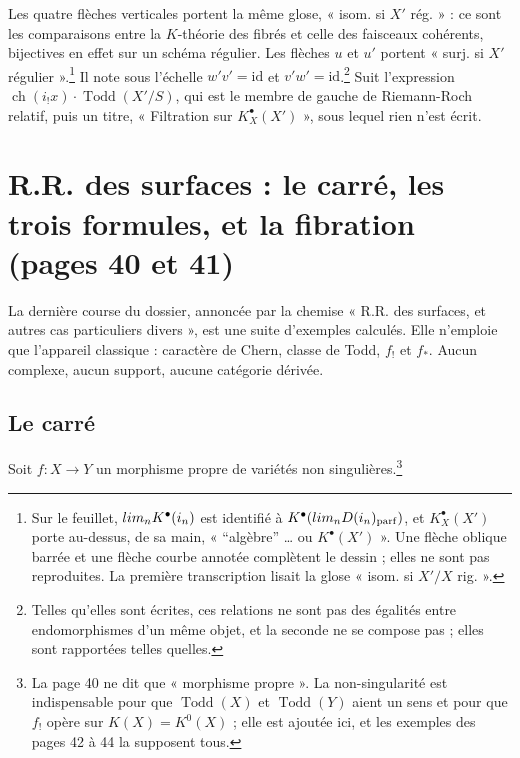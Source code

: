\documentclass[11pt,a4paper]{article}
\begin{document}
Les quatre flèches verticales portent la même glose, « isom. si $X'$ rég. » :
ce sont les comparaisons entre la $K$-théorie des fibrés et celle des faisceaux
cohérents, bijectives en effet sur un schéma régulier. Les flèches $u$ et $u'$
portent « surj. si $X'$ régulier ».\footnote{Sur le feuillet,
$\varinjlim_{n} K^{\bullet}(i_{n})$ est identifié à
$K^{\bullet}(\varinjlim_{n} D(i_{n})_{\mathrm{parf}})$, et $K^{\bullet}_{X}(X')$
porte au-dessus, de sa main, « “algèbre” \ldots{} ou $K^{\bullet}(X')$ ». Une
flèche oblique barrée et une flèche courbe annotée complètent le dessin ; elles
ne sont pas reproduites. La première transcription lisait la glose « isom. si
$X'/X$ rig. ».} Il note sous l'échelle $w'v' = \mathrm{id}$ et
$v'w' = \mathrm{id}$.\footnote{Telles qu'elles sont écrites, ces relations
ne sont pas des égalités entre endomorphismes d'un même objet, et la seconde
ne se compose pas ; elles sont rapportées telles quelles.} Suit l'expression $\operatorname{ch}(i_{!}x)\cdot
\operatorname{Todd}(X'/S)$, qui est le membre de gauche de Riemann-Roch relatif,
puis un titre, « Filtration sur $K^{\bullet}_{X}(X')$ », sous lequel rien
n'est écrit.

\section*{R.R. des surfaces : le carré, les trois formules, et la fibration (pages 40 et 41)}

La dernière course du dossier, annoncée par la chemise « R.R. des surfaces, et
autres cas particuliers divers », est une suite d'exemples calculés. Elle
n'emploie que l'appareil classique : caractère de Chern, classe de Todd,
$f_{!}$ et $f_{*}$. Aucun complexe, aucun support, aucune catégorie dérivée.

\subsection*{Le carré}

Soit $f : X \to Y$ un morphisme propre de variétés non
singulières.\footnote{La page 40 ne dit que « morphisme propre ». La
non-singularité est indispensable pour que $\operatorname{Todd}(X)$ et
$\operatorname{Todd}(Y)$ aient un sens et pour que $f_{!}$ opère sur $K(X) =
K^{0}(X)$ ; elle est ajoutée ici, et les exemples des pages 42 à 44 la
supposent tous.}

\end{document}
